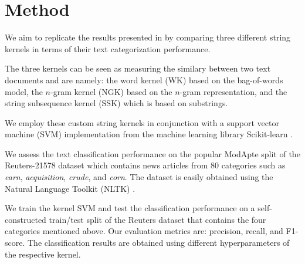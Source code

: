 \section{Method} \label{sec:method}

We aim to replicate the results presented in \cite{kernels} by comparing three different string kernels in terms of their text categorization performance.

The three kernels can be seen as measuring the similary between two text documents and are namely: the word kernel (WK) based on the bag-of-words model, the $n$-gram kernel (NGK) based on the $n$-gram representation, and the string subsequence kernel (SSK) \cite{ssk} which is based on substrings.

We employ these custom string kernels in conjunction with a support vector machine (SVM) implementation from the machine learning library Scikit-learn \cite{sklearn}.

We assess the text classification performance on the popular ModApte split of the Reuters-21578 dataset which contains news articles from $80$ categories such as \textit{earn}, \textit{acquisition}, \textit{crude}, and \textit{corn}. The dataset is easily obtained using the Natural Language Toolkit (NLTK) \cite{nltk}.

We train the kernel SVM and test the classification performance on a self-constructed train/test split of the Reuters dataset that contains the four categories mentioned above. Our evaluation metrics are: precision, recall, and F1-score. The classification results are obtained using different hyperparameters of the respective kernel.


